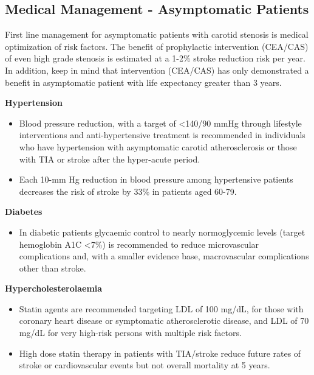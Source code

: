 \documentclass[
]{book}
\providecommand{\tightlist}{%
  \setlength{\itemsep}{0pt}\setlength{\parskip}{0pt}}
\begin{document}
\hypertarget{medical-management---asymptomatic-patients}{%
\subsection{Medical Management - Asymptomatic Patients}\label{medical-management---asymptomatic-patients}}

First line management for asymptomatic patients with carotid stenosis is
medical optimization of risk factors. The benefit of prophylactic
intervention (CEA/CAS) of even high grade stenosis is estimated at a
1-2\% stroke reduction risk per year.
\citep{naylorWhyManagementAsymptomatic2015} In addition, keep in mind that
intervention (CEA/CAS) has only demonstrated a benefit in asymptomatic
patient with life expectancy greater than 3 years.
\citep{bulbuliaAsymptomaticCarotidSurgery2017, halliday10yearStrokePrevention2010, rosenfieldRandomizedTrialStent2016}

\textbf{Hypertension}

\begin{itemize}
\item
  Blood pressure reduction, with a target of \textless140/90 mmHg through
  lifestyle interventions and anti-hypertensive treatment is
  recommended in individuals who have hypertension with asymptomatic
  carotid atherosclerosis or those with TIA or stroke after the
  hyper-acute period.
\item
  Each 10-mm Hg reduction in blood pressure among hypertensive
  patients decreases the risk of stroke by 33\% in patients aged
  60-79.\citep{aiyagari2009}
\end{itemize}

\textbf{Diabetes}

\begin{itemize}
\tightlist
\item
  In diabetic patients glycaemic control to nearly normoglycemic
  levels (target hemoglobin A1C \textless7\%) is recommended to reduce
  microvascular complications and, with a smaller evidence base,
  macrovascular complications other than stroke.\citep{ricotta}
\end{itemize}

\textbf{Hypercholesterolaemia}

\begin{itemize}
\item
  Statin agents are recommended targeting LDL of 100 mg/dL, for those
  with coronary heart disease or symptomatic atherosclerotic disease,
  and LDL of 70 mg/dL for very high-risk persons with multiple risk
  factors.
\item
  High dose statin therapy in patients with TIA/stroke reduce future
  rates of stroke or cardiovascular events but not overall mortality
  at 5 years. \citep{karamHighDoseAtorvastatinStroke2008}
\end{itemize}
\end{document}
